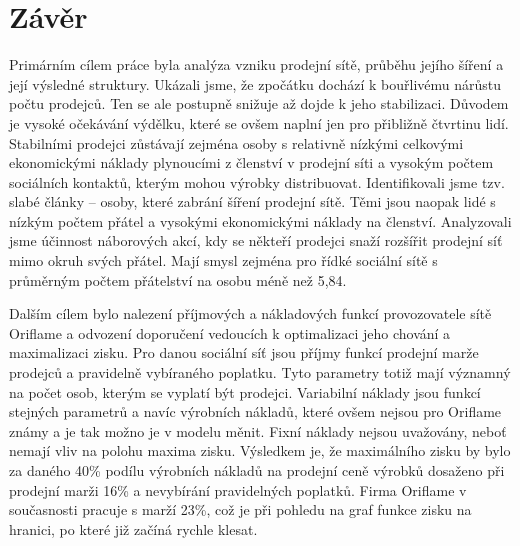 \documentclass[a4wide,12pt]{report}
\begin{document}
\chapter*{Závěr}
\addtocounter{chapter}{1}
Primárním cílem práce byla analýza vzniku prodejní sítě, průběhu jejího šíření a její výsledné struktury. Ukázali jsme, že zpočátku dochází k bouřlivému nárůstu počtu prodejců. Ten se ale postupně snižuje až dojde k jeho stabilizaci. Důvodem je vysoké očekávání výdělku, které se ovšem naplní jen pro přibližně čtvrtinu lidí. Stabilními prodejci zůstávají zejména osoby s relativně nízkými celkovými ekonomickými náklady plynoucími z členství v prodejní síti a vysokým počtem sociálních kontaktů, kterým mohou výrobky distribuovat. Identifikovali jsme tzv. slabé články -- osoby, které zabrání šíření prodejní sítě. Těmi jsou naopak lidé s nízkým počtem přátel a vysokými ekonomickými náklady na členství. Analyzovali jsme účinnost náborových akcí, kdy se někteří prodejci snaží rozšířit prodejní síť mimo okruh svých přátel. Mají smysl zejména pro řídké sociální sítě s průměrným počtem přátelství na osobu méně než 5,84.

Dalším cílem bylo nalezení příjmových a nákladových funkcí provozovatele sítě Oriflame a odvození doporučení vedoucích k optimalizaci jeho chování a maximalizaci zisku. Pro danou sociální síť jsou příjmy funkcí prodejní marže prodejců a pravidelně vybíraného poplatku. Tyto parametry totiž mají významný na počet osob, kterým se vyplatí být prodejci. Variabilní náklady jsou funkcí stejných parametrů a navíc výrobních nákladů, které ovšem nejsou pro Oriflame známy a je tak možno je v modelu měnit. Fixní náklady nejsou uvažovány, neboť nemají vliv na polohu maxima zisku. Výsledkem je, že maximálního zisku by bylo za daného 40\% podílu výrobních nákladů na prodejní ceně výrobků dosaženo při prodejní marži 16\% a nevybírání pravidelných poplatků. Firma Oriflame v současnosti pracuje s marží 23\%, což je při pohledu na graf funkce zisku na hranici, po které již začíná rychle klesat.
\end{document}
